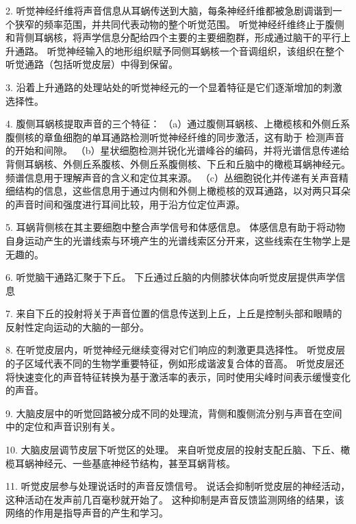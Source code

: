 2. 听觉神经纤维将声音信息从耳蜗传送到大脑，每条神经纤维都被急剧调谐到一个狭窄的频率范围，并共同代表动物的整个听觉范围。
听觉神经纤维终止于腹侧和背侧耳蜗核，将声学信息分配给四个主要的主要细胞群，形成通过脑干的平行上升通路。
听觉神经输入的地形组织赋予同侧耳蜗核一个音调组织，该组织在整个听觉通路（包括听觉皮层）中得到保留。


3. 沿着上升通路的处理站处的听觉神经元的一个显着特征是它们逐渐增加的刺激选择性。


4. 腹侧耳蜗核提取声音的三个特征：
（a）通过腹侧耳蜗核、上橄榄核和外侧丘系腹侧核的章鱼细胞的单耳通路检测听觉神经纤维的同步激活，这有助于 检测声音的开始和间隙。
（b）星状细胞检测并锐化光谱峰谷的编码，并将光谱信息传递给背侧耳蜗核、外侧丘系腹核、外侧丘系腹侧核、下丘和丘脑中的橄榄耳蜗神经元。 
频谱信息用于理解声音的含义和定位其来源。 
（c）丛细胞锐化并传递有关声音精细结构的信息，这些信息用于通过内侧和外侧上橄榄核的双耳通路，以对两只耳朵的声音时间和强度进行耳间比较，用于沿方位定位声源。


5. 耳蜗背侧核在其主要细胞中整合声学信号和体感信息。
体感信息有助于将动物自身运动产生的光谱线索与环境产生的光谱线索区分开来，这些线索在生物学上是无趣的。


6. 听觉脑干通路汇聚于下丘。
下丘通过丘脑的内侧膝状体向听觉皮层提供声学信息

 

7. 来自下丘的投射将关于声音位置的信息传送到上丘，上丘是控制头部和眼睛的反射性定向运动的大脑的一部分。 

8. 在听觉皮层内，听觉神经元继续变得对它们响应的刺激更具选择性。
听觉皮层的子区域代表不同的生物学重要特征，例如形成谐波复合体的音高。
听觉皮层还将快速变化的声音特征转换为基于激活率的表示，同时使用尖峰时间表示缓慢变化的声音。


9. 大脑皮层中的听觉回路被分成不同的处理流，背侧和腹侧流分别与声音在空间中的定位和声音识别有关。 

10. 大脑皮层调节皮层下听觉区的处理。
来自听觉皮层的投射支配丘脑、下丘、橄榄耳蜗神经元、一些基底神经节结构，甚至耳蜗背核。


11. 听觉皮层参与处理说话时的声音反馈信号。
说话会抑制听觉皮层的神经活动，这种活动在发声前几百毫秒就开始了。
这种抑制是声音反馈监测网络的结果，该网络的作用是指导声音的产生和学习。

